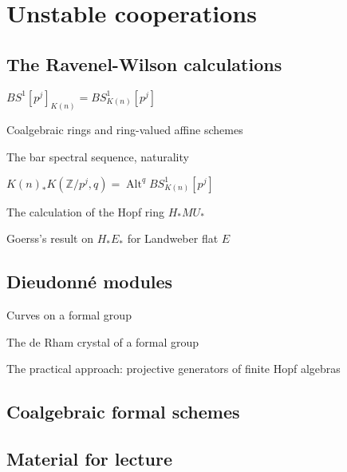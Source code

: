 \documentclass[12pt]{book}
\newcommand{\Z}{\mathbb Z}
\newcommand{\<}{\langle}
\renewcommand{\>}{\rangle}
\numberwithin{equation}{section}
\theoremstyle{plain}
\theoremstyle{definition}
\theoremstyle{remark}
\begin{document}
\renewcommand\chaptername{Case study}
\renewcommand\cftchappresnum{{Case study}\space}













\chapter{Unstable cooperations}


\section{The Ravenel-Wilson calculations}

$BS^1[p^j]_{K(n)} = BS^1_{K(n)}[p^j]$

Coalgebraic rings and ring-valued affine schemes

The bar spectral sequence, naturality

$K(n)_* K(\Z/p^j, q) = \operatorname{Alt}^q BS^1_{K(n)}[p^j]$

The calculation of the Hopf ring $H_* MU_*$

Goerss's result on $H_* E_*$ for Landweber flat $E$


\section{Dieudonn\'e modules}

Curves on a formal group

The de Rham crystal of a formal group

The practical approach: projective generators of finite Hopf algebras

\section{Coalgebraic formal schemes}

















\section*{Material for lecture}
\end{document}
